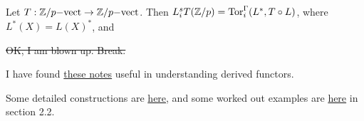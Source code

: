     \begin{lemma}
        Let $T:{\mathbb{Z}}/p{\mathrm{-vect}} \to {\mathbb{Z}}/p{\mathrm{-vect}}$.
        Then $L_i^sT({\mathbb{Z}}/p) = \operatorname{Tor}_i^\Gamma(L^\ast,T\circ L)$,
        where $L^\ast(X) = L(X)^\ast$, and
    \end{lemma}
    
    \sout{OK, I am blown up. Break.}
    
    I have found 
    \href{http://www-irma.u-strasbg.fr/~vespa/Cesaro.pdf}{these notes}
    useful in understanding derived functors.
    
    Some detailed constructions are 
    \href{http://www.math.ku.dk/english/research/top/paststudents/gabe.msproject.2010.pdf}
    {here},
    and some worked out examples are
    \href{http://arxiv.org/pdf/0910.2817.pdf}{here} in section 2.2.




 
 